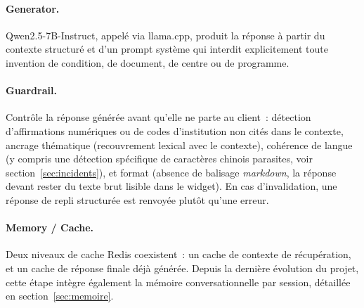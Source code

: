 \paragraph{Generator.} Qwen2.5-7B-Instruct, appelé via llama.cpp, produit la réponse à partir du contexte structuré et d'un prompt système qui interdit explicitement toute invention de condition, de document, de centre ou de programme.

\paragraph{Guardrail.} Contrôle la réponse générée avant qu'elle ne parte au client~: détection d'affirmations numériques ou de codes d'institution non cités dans le contexte, ancrage thématique (recouvrement lexical avec le contexte), cohérence de langue (y compris une détection spécifique de caractères chinois parasites, voir section~\ref{sec:incidents}), et format (absence de balisage \emph{markdown}, la réponse devant rester du texte brut lisible dans le widget). En cas d'invalidation, une réponse de repli structurée est renvoyée plutôt qu'une erreur.

\paragraph{Memory / Cache.} Deux niveaux de cache Redis coexistent~: un cache de contexte de récupération, et un cache de réponse finale déjà générée. Depuis la dernière évolution du projet, cette étape intègre également la mémoire conversationnelle par session, détaillée en section~\ref{sec:memoire}.
